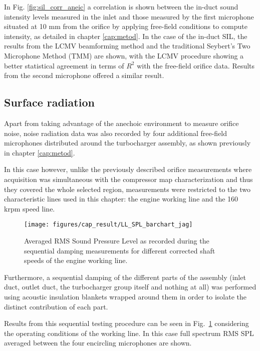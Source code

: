 In Fig. \ref{fig:sil_corr_aneic} a correlation is shown between the  in-duct sound intensity levels measured in the inlet and those measured by the first microphone situated at 10 mm from the orifice by applying free-field conditions to compute intensity, as detailed in chapter \ref{cap:metod}. In the case of the in-duct SIL, the results from the LCMV beamforming method and the traditional Seybert's \cite{seybert1988two} Two Microphone Method (TMM) are shown, with the LCMV procedure showing a better statistical agreement in terms of $R^2$ with the free-field orifice data. Results from the second microphone offered a similar result.

\subsection{Surface radiation}

Apart from taking advantage of the anechoic environment to measure orifice noise, noise radiation data was also recorded by four additional free-field microphones distributed around the turbocharger assembly, as shown previously in chapter \ref{cap:metod}.

In this case however, unlike the previously described orifice measurements where acquisition was simultaneous with the compressor map characterization and thus they covered the whole selected region, measurements were restricted to the two characteristic lines used in this chapter: the engine working line and the 160 krpm speed line.

\begin{figure}[tbh!]
\centering
\texttt{[image: figures/cap\_result/LL\_SPL\_barchart\_jag]}
\caption{Averaged RMS Sound Pressure Level as recorded during the sequential damping measurements for different corrected shaft speeds of the engine working line.}
\label{fig:result_spl_radiated_comp_bar_LL}
\end{figure}

Furthermore, a sequential damping of the different parts of the assembly (inlet duct, outlet duct, the turbocharger group itself and nothing at all) was performed using acoustic insulation blankets wrapped around them in order to isolate the distinct contribution of each part. 

Results from this sequential testing procedure can be seen in Fig.~\ref{fig:result_spl_radiated_comp_bar_LL} considering the operating conditions of the working line. In this case full spectrum RMS SPL averaged between the four encircling microphones are shown. 


